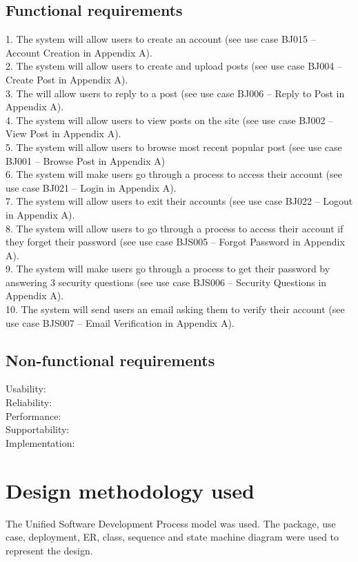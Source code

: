 \documentclass{report}
\begin{document}
	\subsection{Functional requirements}
	1.	The system will allow users to create an account (see use case BJ015 – Account Creation in Appendix A).\\
	2.	The system will allow users to create and upload posts (see use case BJ004 – Create Post in Appendix A).\\
	3.	The will allow users to reply to a post (see use case BJ006 – Reply to Post in Appendix A).\\
	4.	The system will allow users to view posts on the site (see use case BJ002 – View Post in Appendix A).\\
	5.	The system will allow users to browse most recent popular post (see use case BJ001 – Browse Post in Appendix A)\\
	6.	The system will make users go through a process to access their account (see use case BJ021 – Login in Appendix A).\\
	7.	The system will allow users to exit their accounts (see use case BJ022 – Logout in Appendix A).\\
	8.	The system will allow users to go through a process to access their account if they forget their password (see use case BJS005 – Forgot Password in Appendix A).\\
	9.	The system will make users go through a process to get their password by answering 3 security questions (see use case BJS006 – Security Questions in Appendix A).\\
	10.	The system will send users an email asking them to verify their account (see use case BJS007 – Email Verification in Appendix A).\\
	\subsection{Non-functional requirements}
	Usability: \\
	Reliability: \\
	Performance: \\
	Supportability: \\
	Implementation: \\
\section{Design methodology used} 
	The Unified Software Development Process model was used. The package, use case, deployment, ER, class, sequence and state machine diagram were used to represent the design.
\end{document}

